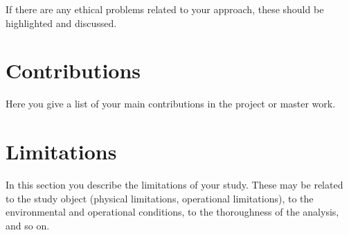 If there are any ethical problems related to your approach, these should be highlighted and discussed.

\section{Contributions}
Here you give a list of your main contributions in the project or master work.

\section{Limitations}
In this section you describe the limitations of your study. These may be related to the study object (physical limitations, operational limitations), to the environmental and operational conditions, to the thoroughness of the analysis, and so on.


